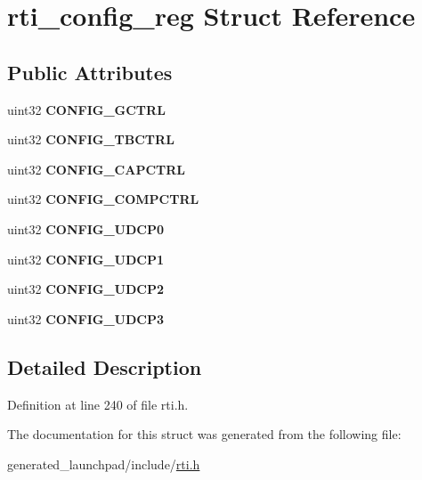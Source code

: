 \hypertarget{structrti__config__reg}{}\section{rti\+\_\+config\+\_\+reg Struct Reference}
\label{structrti__config__reg}
\subsection*{Public Attributes}
\begin{DoxyCompactItemize}
\item 
\mbox{\label{structrti__config__reg_a43c98650e268f0050625dfa11087e0b6}} 
uint32 {\bfseries C\+O\+N\+F\+I\+G\+\_\+\+G\+C\+T\+RL}
\item 
\mbox{\label{structrti__config__reg_af72566dc524fdd9228847929685e8a91}} 
uint32 {\bfseries C\+O\+N\+F\+I\+G\+\_\+\+T\+B\+C\+T\+RL}
\item 
\mbox{\label{structrti__config__reg_aa3660a8ad3352bd56226b5f58320eca4}} 
uint32 {\bfseries C\+O\+N\+F\+I\+G\+\_\+\+C\+A\+P\+C\+T\+RL}
\item 
\mbox{\label{structrti__config__reg_a15ea7ac8ed74139d1cf2663103464498}} 
uint32 {\bfseries C\+O\+N\+F\+I\+G\+\_\+\+C\+O\+M\+P\+C\+T\+RL}
\item 
\mbox{\label{structrti__config__reg_a782445dc383849065598147ce70837e4}} 
uint32 {\bfseries C\+O\+N\+F\+I\+G\+\_\+\+U\+D\+C\+P0}
\item 
\mbox{\label{structrti__config__reg_a53db327a76fc9d7ae8fcc17639371a82}} 
uint32 {\bfseries C\+O\+N\+F\+I\+G\+\_\+\+U\+D\+C\+P1}
\item 
\mbox{\label{structrti__config__reg_ab613b2f83fc912023954069748ef6906}} 
uint32 {\bfseries C\+O\+N\+F\+I\+G\+\_\+\+U\+D\+C\+P2}
\item 
\mbox{\label{structrti__config__reg_af7b68f2fa12da993a64bb0ac250a995a}} 
uint32 {\bfseries C\+O\+N\+F\+I\+G\+\_\+\+U\+D\+C\+P3}
\end{DoxyCompactItemize}


\subsection{Detailed Description}


Definition at line 240 of file rti.\+h.



The documentation for this struct was generated from the following file\+:\begin{DoxyCompactItemize}
\item 
generated\+\_\+launchpad/include/\mbox{\hyperlink{rti_8h}{rti.\+h}}\end{DoxyCompactItemize}
